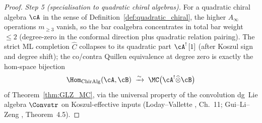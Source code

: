 \begin{proof}
\emph{Step 5 \textup(specialisation to quadratic chiral algebras\textup).}
For a quadratic chiral algebra $\cA$ in the sense of
Definition~\ref{def:quadratic_chiral}, the higher $A_\infty$ operations
$m_{\geq 3}$ vanish, so the bar coalgebra concentrates in
total bar weight $\leq 2$ (degree-zero in the conformal direction
plus quadratic relation pairing). The strict ML completion
$\widehat C$ collapses to its quadratic part
$\cA^!\,[1]$ \textup(after Koszul sign and degree shift\textup); the
co/contra Quillen equivalence at degree zero is exactly the
hom-space bijection
\[
\Hom_{\mathrm{ChirAlg}}(\cA, \cB)
 \;\xrightarrow{\sim}\;
 \MC\bigl(\cA^! \widehat\otimes \cB\bigr)
\]
of Theorem~\ref{thm:GLZ_MC}, via the universal property of the
convolution dg~Lie algebra $\Convstr$ on Koszul-effective inputs
\textup(Loday--Vallette \cite{LV12}, Ch.~11; Gui--Li--Zeng
\cite{GLZ22}, Theorem~4.5\textup).
\end{proof}

